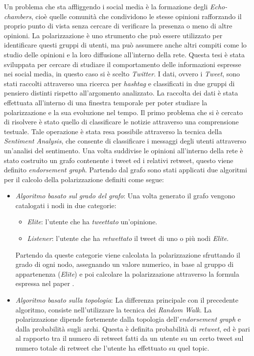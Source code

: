\begin{spacing}{1.0}
Un problema che sta affliggendo i social media è la formazione degli \textit{Echo-chambers}, cioè quelle comunità che condividono le stesse opinioni rafforzando il proprio punto di vista senza cercare di verificare la presenza o meno di altre opinioni. La polarizzazione è uno strumento che può essere utilizzato per identificare questi gruppi di utenti, ma può assumere anche altri compiti come lo studio delle opinioni e la loro diffusione all'interno della rete.
Questa tesi è stata sviluppata per cercare di studiare il comportamento delle informazioni espresse nei social media, in questo caso si è scelto \textit{Twitter}. 
I dati, ovvero i \textit{Tweet}, sono stati raccolti attraverso una ricerca per \textit{hashtag} e classificati in due gruppi di pensiero distinti rispetto all'argomento analizzato.
La raccolta dei dati è stata effettuata all'interno di una finestra temporale per poter studiare la polarizzazione e la sua evoluzione nel tempo.
Il primo problema che si è cercato di risolvere è stato quello di classificare le notizie attraverso una comprensione testuale. Tale operazione è stata resa possibile attraverso la tecnica della \textit{Sentiment Analysis}, che consente di classificare i messaggi degli utenti attraverso un'analisi del sentimento. 
Una volta suddivise le opinioni all'interno della rete è stato costruito un grafo contenente i tweet ed i relativi retweet, questo viene definito \textit{endorsement graph}.
Partendo dal grafo sono stati applicati due algoritmi per il calcolo della polarizzazione definiti come segue:
\begin{itemize}
\item \textit{Algoritmo basato sul grado del grafo}: Una volta generato il grafo vengono catalogati i nodi in due categorie:
\begin{itemize}
\item \textit{Elite}: l'utente che ha \textit{tweettato} un'opinione.
\item \textit{Listener}: l'utente che ha \textit{retwettato} il tweet di uno o più nodi \textit{Elite}.
\end{itemize}
Partendo da queste categorie viene calcolata la polarizzazione sfruttando il grado di ogni nodo, assegnando un valore numerico, in base al gruppo di appartenenza (\textit{Elite}) e poi calcolare la polarizzazione attraverso la formula espressa nel paper \cite{morales2015polarization}.
\item \textit{Algoritmo basato sulla topologia}: La differenza principale con il precedente algoritmo, consiste nell'utilizzare la tecnica dei \textit{Random Walk}. La polarizzazione dipende fortemente dalla topologia dell'\textit{endorsement graph} e dalla probabilità sugli archi. Questa è definita probabilità di \textit{retweet}, ed è pari al rapporto tra il numero di retweet fatti da un utente su un certo tweet sul numero totale di retweet che l'utente ha effettuato su quel topic. 

\end{itemize}
\end{spacing}
